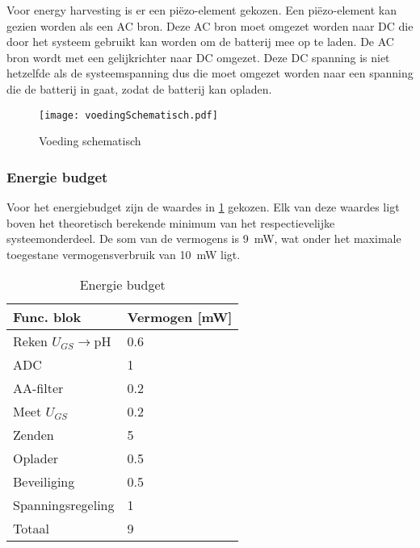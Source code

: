 Voor energy harvesting is er een piëzo-element gekozen. Een piëzo-element kan gezien worden als een AC bron. Deze AC bron moet omgezet worden naar DC die door het systeem gebruikt kan worden om de batterij mee op te laden. De AC bron wordt met een gelijkrichter naar DC omgezet. Deze DC spanning is niet hetzelfde als de systeemspanning dus die moet omgezet worden naar een spanning die de batterij in gaat, zodat de batterij kan opladen.

\begin{figure}[!htbp]
    \centering
    \texttt{[image: voedingSchematisch.pdf]}
    \caption{Voeding schematisch}
    \label{fig:voedingSchematisch}
\end{figure}



\subsubsection{Energie budget}\label{sec:energyBudgets}
Voor het energiebudget zijn de waardes in \cref{tab:energieBudgetEstimatie} gekozen. Elk van deze waardes ligt boven het theoretisch berekende minimum van het respectievelijke systeemonderdeel. De som van de vermogens is \qty{9}{\milli\watt}, wat onder het maximale toegestane vermogensverbruik van \qty{10}{\milli\watt} ligt.


\begin{table}[!htbp]
    \centering
    \begin{tabular}{l|l}
        Func. blok          & Vermogen [mW] \\
        \hline
        Reken $U_{GS}\rightarrow$pH & 0.6   \\
        ADC                 & 1             \\
        AA-filter           & 0.2           \\
        Meet $U_{GS}$       & 0.2           \\
        Zenden              & 5             \\
        Oplader             & 0.5           \\
        Beveiliging         & 0.5           \\
        Spanningsregeling   & 1             \\
        \hline
        \hline
        Totaal              & 9

    \end{tabular}
    \caption{Energie budget}
    \label{tab:energieBudgetEstimatie}
\end{table}


